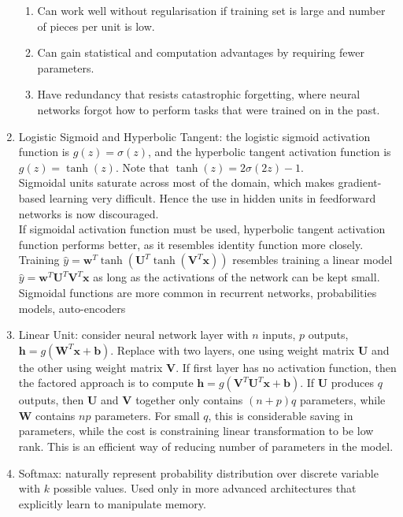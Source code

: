 \begin{definition}
\begin{enumerate}[label=\roman*.]
\begin{enumerate}[label=\arabic*.]
\setlength{\itemsep}{0pt}
\item Can work well without regularisation if training set is large and number of pieces per unit is low.
\item Can gain statistical and computation advantages by requiring fewer parameters.
\item Have redundancy that resists catastrophic forgetting, where neural networks forgot how to perform tasks that were trained on in the past.
\end{enumerate}
\item Logistic Sigmoid and Hyperbolic Tangent: the logistic sigmoid activation function is $g(z) = \sigma(z)$, and the hyperbolic tangent activation function is $g(z) = \tanh(z)$. Note that $\tanh(z) = 2 \sigma(2z) - 1$.\\
Sigmoidal units saturate across most of the domain, which makes gradient-based learning very difficult. Hence the use in hidden units in feedforward networks is now discouraged.\\
If sigmoidal activation function must be used, hyperbolic tangent activation function performs better, as it resembles identity function more closely. Training $\hat{y} = \bm{w}^T \tanh(\bm{U}^T \tanh(\bm{V}^T \bm{x}))$ resembles training a linear model $\hat{y} = \bm{w}^T \bm{U}^T \bm{V}^T \bm{x}$ as long as the activations of the network can be kept small.\\
Sigmoidal functions are more common in recurrent networks, probabilities models, auto-encoders
\item Linear Unit: consider neural network layer with $n$ inputs, $p$ outputs, $\bm{h} = g(\bm{W}^T \bm{x} + \bm{b})$. Replace with two layers, one using weight matrix $\bm{U}$ and the other using weight matrix $\bm{V}$. If first layer has no activation function, then the factored approach is to compute $\bm{h} = g(\bm{V}^T \bm{U}^T \bm{x} + \bm{b})$. If $\bm{U}$ produces $q$ outputs, then $\bm{U}$ and $\bm{V}$ together only contains $(n+p)q$ parameters, while $\bm{W}$ contains $np$ parameters. For small $q$, this is considerable saving in parameters, while the cost is constraining linear transformation to be low rank. This is an efficient way of reducing number of parameters in the model.
\item Softmax: naturally represent probability distribution over discrete variable with $k$ possible values. Used only in more advanced architectures that explicitly learn to manipulate memory.

\end{enumerate}
\end{definition}
